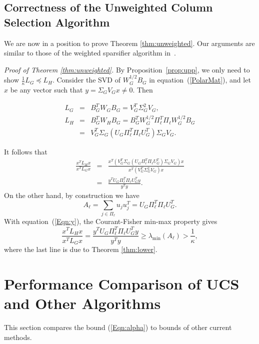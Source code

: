 \documentclass[final,leqno,onefignum,onetabnum]{siamltex1213}
\begin{document}
\subsection{Correctness of the Unweighted Column Selection Algorithm}\label{sec:33}

We are now in a position to prove Theorem \ref{thm:unweighted}. Our
arguments are similar to those of the weighted sparsifier algorithm in~\cite{ramanujansparse}.

{\em Proof of Theorem \ref{thm:unweighted}.} By
Proposition~\ref{prop:upp}, we only need to show $\frac{1}{\kappa} L_G
\preceq L_H$. Consider the SVD of $W_G^{1/2} B_G$ in equation~(\ref{PolarMat}), and let ${x}$ be any vector such that $y = \Sigma_G V_G x \not=0$. Then 

\begin{eqnarray*}
{\displaystyle  L_G} &=& {\displaystyle B_G^T W_G B_G = V_G^T \Sigma_G^2V_G} ,  \\
{\displaystyle  L_H} &=& {\displaystyle  B_G^T W_H B_G  =  B_G^T W_G^{1/2} \Pi_{\ell}^T\Pi_{\ell} W_G^{1/2} B_G} \\
                     &=& {\displaystyle V_G^T \Sigma_G \left( U_G \Pi_{\ell}^T\Pi_{\ell} U_G^T\right)\Sigma_G V_G} . \end{eqnarray*}
 
It follows that 
\begin{eqnarray}
{\displaystyle \frac{{x}^TL_H{x}}{{x}^TL_G{x}}} & = & 
\frac{x^T\left(V_G^T \Sigma_G \left( U_G \Pi_{\ell}^T\Pi_{\ell} U_G^T\right)\Sigma_G V_G \right)x}{x^T\left(V_G^T \Sigma_G^2V_G\right)x }\nonumber\\
&=&{\displaystyle \frac{{y}^TU_G\Pi_{\ell}^T\Pi_{\ell}U_G^T{y}}{{y}^T{y}}.} \label{Eqn:y}
\end{eqnarray} 
On the other hand, by construction we have 
\[{\displaystyle A_{\ell}  = \sum_{j\in\Pi_{\ell}} {u}_j{u}_j^T= U_G \Pi_{\ell}^T\Pi_{\ell} U_G^T.}\]
With equation~(\ref{Eqn:y}), the Courant-Fisher min-max property gives
\[ {\displaystyle \frac{{x}^TL_H{x}}{{x}^TL_G{x}} =
\frac{{y}^TU_G\Pi_{\ell}^T\Pi_{\ell}U_G^T{y}}{{y}^T{y}} \ge  \lambda_{\min} \left( A_{\ell} \right) > \frac{1}{\kappa}, } \]
where the last line is due to Theorem \ref{thm:lower}.
\hspace{2 em}\endproof

\section{Performance Comparison of UCS and Other Algorithms}
This section compares the bound (\ref{Eqn:alpha}) to bounds of other current methods.  
\end{document}
